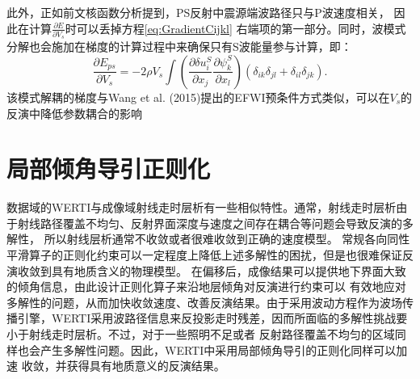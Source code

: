 此外，正如前文核函数分析提到，PS反射中震源端波路径只与P波速度相关，
因此在计算$\frac{\partial E}{\partial V_s}$时可以丢掉方程\eqref{eq:GradientCijkl} 
右端项的第一部分。同时，波模式分解也会施加在梯度的计算过程中来确保只有S波能量参与计算，即：
\begin{equation}
    \frac{\partial E_{ps}}{\partial V_s}=-2\rho V_s
    \int (\frac{\partial \delta u^S_{i}}{\partial
    x_j}\frac{\partial \psi^S_{k}}{\partial x_l})
    (\delta_{ik}\delta_{jl}+
    \delta_{il}\delta_{jk}).
    \label{eq:GradientVel_S}
\end{equation}
该模式解耦的梯度与Wang et al.
(2015)\cite{wang:2015}提出的EFWI预条件方式类似，可以在$V_s$的反演中降低参数耦合的影响

\section{局部倾角导引正则化}
数据域的WERTI与成像域射线走时层析有一些相似特性。通常，射线走时层析由于射线路径覆盖不均匀、反射界面深度与速度之间存在耦合等问题会导致反演的多解性，
所以射线层析通常不收敛或者很难收敛到正确的速度模型。
常规各向同性平滑算子的正则化约束可以一定程度上降低上述多解性的困扰，但是也很难保证反演收敛到具有地质含义的物理模型。
在偏移后，成像结果可以提供地下界面大致的倾角信息，由此设计正则化算子来沿地层倾角对反演进行约束可以
有效地应对多解性的问题，从而加快收敛速度、改善反演结果。由于采用波动方程作为波场传播引擎，WERTI采用波路径信息来反投影走时残差，因而所面临的多解性挑战要
小于射线走时层析。不过，对于一些照明不足或者
反射路径覆盖不均匀的区域同样也会产生多解性问题。因此，WERTI中采用局部倾角导引的正则化同样可以加速
收敛，并获得具有地质意义的反演结果。


